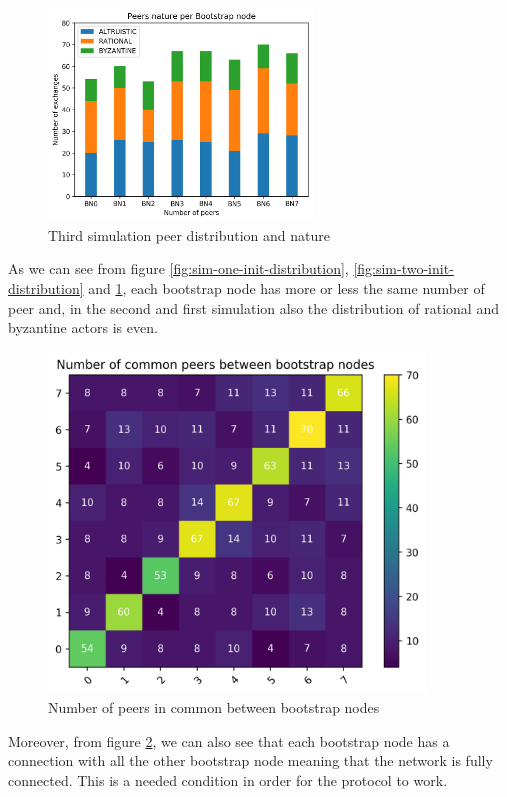 \documentclass[mscthesis]{usiinfthesis}
\begin{document}
\begin{figure}[H]
  \centering
  \includegraphics[width=7cm]{images/3/3-peer-nature-per-bn.png}
  \caption{Third simulation peer distribution and nature}
  \label{fig:sim-three-init-distribution}
\end{figure}

As we can see from figure \ref{fig:sim-one-init-distribution}, \ref{fig:sim-two-init-distribution} and \ref{fig:sim-three-init-distribution}, each bootstrap node has more or less the same number of peer and, in the second and first simulation also the distribution of rational and byzantine actors is even. \\

\begin{figure}[H]
  \centering
  \includegraphics[width=10cm]{images/1/1-connectivity-heatmap.png}
  \caption{Number of peers in common between bootstrap nodes}
  \label{fig:connectivity-general}
\end{figure}

Moreover, from figure \ref{fig:connectivity-general}, we can also see that each bootstrap node has a connection with all the other bootstrap node meaning that the network is fully connected. This is a needed condition in order for the protocol to work. 
\newpage
\end{document}
